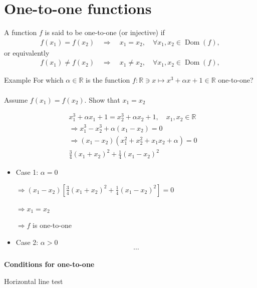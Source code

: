 \documentclass{report}
\begin{document}
	\section{One-to-one functions}
		
		A function $f$ is said to be one-to-one (or injective) if
		\begin{align*}
			f(x_1) = f(x_2) \quad \Longrightarrow \quad x_1 = x_2, \quad \forall x_1,x_2 \in \operatorname{Dom}(f),
		\end{align*}
		or equivalently
		\begin{align*}
			f(x_1) \neq f(x_2) \quad \Longrightarrow \quad x_1 \neq x_2, \quad \forall x_1,x_2 \in \operatorname{Dom}(f),
		\end{align*}

		\begin{question}{Example}
			For which $\alpha \in \mathbb{R}$ is the function $f:\mathbb{R} \ni x \mapsto x^3 + \alpha x + 1 \in \mathbb{R}$ one-to-one?
			\\ \\
			Assume $f(x_1) = f(x_2)$. Show that $x_1 = x_2$

			\begin{align*}
				& x_1^3 + \alpha x_1 + 1 = x_2^3 + \alpha x_2 + 1, \quad x_1,x_2 \in \mathbb{R}	\\
				& \Rightarrow x_1^3 - x_2^3 + \alpha (x_1 - x_2) = 0	\\
				& \Rightarrow (x_1 - x_2) (x_1^2 + x_2^2 + x_1x_2 + \alpha) = 0	\\
				& \frac{3}{4} (x_1+x_2)^2 + \frac{1}{4} (x_1-x_2)^2
			\end{align*}

			\begin{itemize}
				\item Case 1: $\alpha = 0$

					\quad $\Rightarrow (x_1 - x_2)\left[\frac{3}{4} (x_1 + x_2)^2 + \frac{1}{4} (x_1 - x_2)^2\right] = 0$

					\quad $\Rightarrow x_1 = x_2$

					\quad $\Rightarrow f$ is one-to-one
				\item Case 2: $\alpha > 0$
					\begin{align*}
						\cdots
					\end{align*}
			\end{itemize}
		\end{question}

		\textbf{Conditions for one-to-one}

			Horizontal line test
\end{document}

